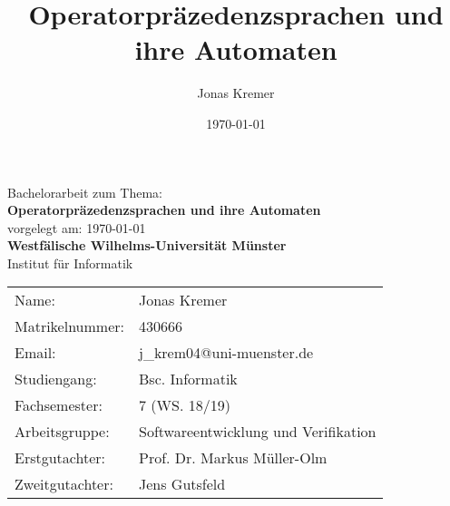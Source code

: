 \documentclass[11pt]{article}
\author{Jonas Kremer}
\title{Operatorpräzedenzsprachen und ihre Automaten}
\date{\today{}}
\theoremstyle{remark}
\theoremstyle{corollary}
\begin{document}
\begin{titlepage}
\thispagestyle{empty}
    \begin{center}
    \large Bachelorarbeit zum Thema:\\
    \vspace{0.5cm}
    \huge \textbf{\textbf{Operatorpräzedenzsprachen und ihre Automaten}} \\
    \vspace{1cm}
    \normalsize
    vorgelegt am: \today \\
    \vspace{2.5cm}
    \large \textbf{Westfälische Wilhelms-Universität Münster}\\
    \vspace{0.5cm} 
    Institut für Informatik
    \vspace{2cm}
    \end{center}
 \normalsize{
    \begin{tabular}{ll}
    	Name: & Jonas Kremer \\
    	Matrikelnummer: & 430666 \\
    	Email: & j\_krem04@uni-muenster.de \\
    	Studiengang: & Bsc. Informatik\\
    	Fachsemester: & 7 (WS. 18/19)\\
    	Arbeitsgruppe: & Softwareentwicklung und Verifikation \\
      	Erstgutachter: & Prof. Dr. Markus Müller-Olm \\
      	Zweitgutachter: & Jens Gutsfeld \\
    \end{tabular}\\
    }
\end{titlepage}

\thispagestyle{empty}
\setcounter{tocdepth}{2}

\tableofcontents
\newpage
\nocite{*}












\thispagestyle{empty}




\newpage
{}

\end{document}
